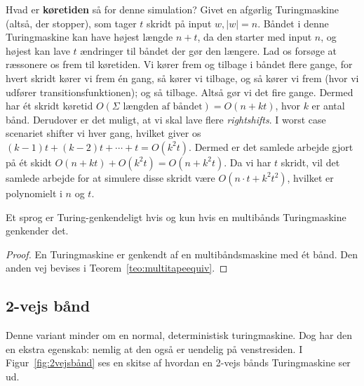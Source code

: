 Hvad er \textbf{køretiden} så for denne simulation? Givet en afgørlig Turingmaskine (altså, der stopper), som tager $t$ skridt på input $w, |w| = n$. Båndet i denne Turingmaskine kan have højest længde $n + t$, da den starter med input $n$, og højest kan lave $t$ ændringer til båndet der gør den længere. Lad os forsøge at ræssonere os frem til køretiden. Vi kører frem og tilbage i båndet flere gange, for hvert skridt kører vi frem én gang, så kører vi tilbage, og så kører vi frem (hvor vi udfører transitionsfunktionen); og så tilbage. Altså gør vi det fire gange. Dermed har ét skridt køretid $O(\Sigma \text{ længden af båndet}) = O(n+kt)$, hvor $k$ er antal bånd. Derudover er det muligt, at vi skal lave flere \textit{rightshifts}. I worst case scenariet shifter vi hver gang, hvilket giver os $(k-1)t + (k-2)t + \cdots + t = O(k^{2}t)$. Dermed er det samlede arbejde gjort på ét skidt $O(n+kt)+O(k^{2}t) = O(n+k^{2}t)$. Da vi har $t$ skridt, vil det samlede arbejde for at simulere disse skridt være $O(n \cdot t + k^{2}t^{2})$, hvilket er polynomielt i $n$ og $t$.




\begin{corollary}
	Et sprog er Turing-genkendeligt hvis og kun hvis en multibånds Turingmaskine genkender det.
\end{corollary}

\begin{proof}
	En Turingmaskine er genkendt af en multibåndsmaskine med ét bånd. Den anden vej bevises i Teorem~\ref{teo:multitapeequiv}.
\end{proof}


\subsection{2-vejs bånd}
\label{subsec:2vejsbånd}

Denne variant minder om en normal, deterministisk turingmaskine. Dog har den en ekstra egenskab: nemlig at den også er uendelig på venstresiden. I Figur~\ref{fig:2vejsbånd} ses en skitse af hvordan en 2-vejs bånds Turingmaskine ser ud.

